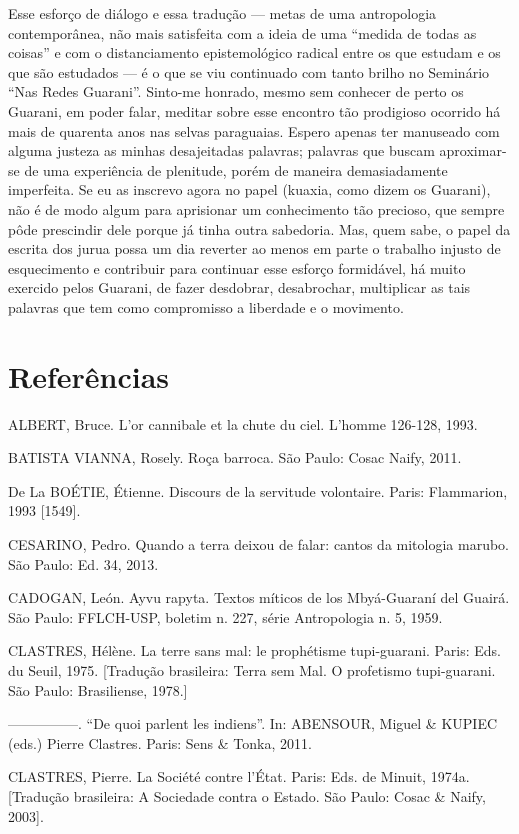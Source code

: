 Esse esforço de diálogo e essa tradução — metas de uma antropologia
contemporânea, não mais satisfeita com a ideia de uma ``medida de todas
as coisas'' e com o distanciamento epistemológico radical entre os que
estudam e os que são estudados — é o que se viu continuado com tanto
brilho no Seminário ``Nas Redes Guarani''. Sinto-me honrado, mesmo sem
conhecer de perto os Guarani, em poder falar, meditar sobre esse
encontro tão prodigioso ocorrido há mais de quarenta anos nas selvas
paraguaias. Espero apenas ter manuseado com alguma justeza as minhas
desajeitadas palavras; palavras que buscam aproximar-se de uma
experiência de plenitude, porém de maneira demasiadamente imperfeita.
Se eu as inscrevo agora no papel (kuaxia, como dizem os Guarani), não é
de modo algum para aprisionar um conhecimento tão precioso, que sempre
pôde prescindir dele porque já tinha outra sabedoria. Mas, quem sabe, o
papel da escrita dos jurua possa um dia reverter ao menos em parte o
trabalho injusto de esquecimento e contribuir para continuar esse
esforço formidável, há muito exercido pelos Guarani, de fazer
desdobrar, desabrochar, multiplicar as tais palavras que tem como
compromisso a liberdade e o movimento.

\section{Referências}

ALBERT, Bruce. L’or cannibale et la chute du ciel. L’homme 126-128,
1993.

BATISTA VIANNA, Rosely. Roça barroca. São Paulo: Cosac Naify, 2011.

De La BOÉTIE, Étienne. Discours de la servitude volontaire. Paris:
Flammarion, 1993 [1549].

CESARINO, Pedro. Quando a terra deixou de falar: cantos da mitologia
marubo. São Paulo: Ed. 34, 2013.

CADOGAN, León. Ayvu rapyta. Textos míticos de los Mbyá-Guaraní del
Guairá. São Paulo: FFLCH-USP, boletim n. 227, série Antropologia n. 5,
1959.

CLASTRES, Hélène. La terre sans mal: le prophétisme tupi-guarani. Paris:
Eds. du Seuil, 1975. [Tradução brasileira: Terra sem Mal. O profetismo
tupi-guarani. São Paulo: Brasiliense, 1978.]

—————. ``De quoi parlent les indiens''. In: ABENSOUR, Miguel \& KUPIEC
(eds.) Pierre Clastres. Paris: Sens \& Tonka, 2011.

CLASTRES, Pierre. La Société contre l’État. Paris: Eds. de Minuit,
1974a. [Tradução brasileira: A Sociedade contra o Estado. São Paulo:
Cosac \& Naify, 2003].

